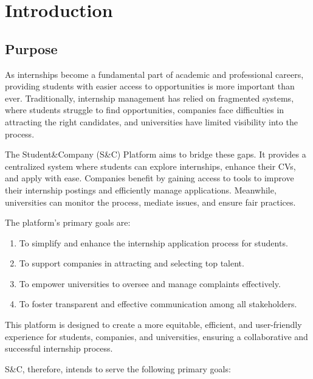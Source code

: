 \chapter{Introduction}

\section{Purpose}
As internships become a fundamental part of academic and professional careers, providing students with easier access to opportunities is more important than ever. Traditionally, internship management has relied on fragmented systems, where students struggle to find opportunities, companies face difficulties in attracting the right candidates, and universities have limited visibility into the process.

The Student\&Company (S\&C) Platform aims to bridge these gaps. It provides a centralized system where students can explore internships, enhance their CVs, and apply with ease. Companies benefit by gaining access to tools to improve their internship postings and efficiently manage applications. Meanwhile, universities can monitor the process, mediate issues, and ensure fair practices.

The platform’s primary goals are:
\begin{enumerate}
    \item To simplify and enhance the internship application process for students.
    \item To support companies in attracting and selecting top talent.
    \item To empower universities to oversee and manage complaints effectively.
    \item To foster transparent and effective communication among all stakeholders.
\end{enumerate}

This platform is designed to create a more equitable, efficient, and user-friendly experience for students, companies, and universities, ensuring a collaborative and successful internship process.

S\&C, therefore, intends to serve the following primary goals:

